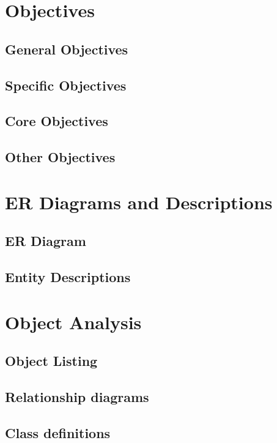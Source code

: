 \begin{center}
\begin{tabular}
\section{Objectives}

\subsection{General Objectives}

\subsection{Specific Objectives}

\subsection{Core Objectives}

\subsection{Other Objectives}

\section{ER Diagrams and Descriptions}

\subsection{ER Diagram}

\subsection{Entity Descriptions}

\section{Object Analysis}

\subsection{Object Listing}

\subsection{Relationship diagrams}

\subsection{Class definitions}


\end{tabular}
\end{center}
